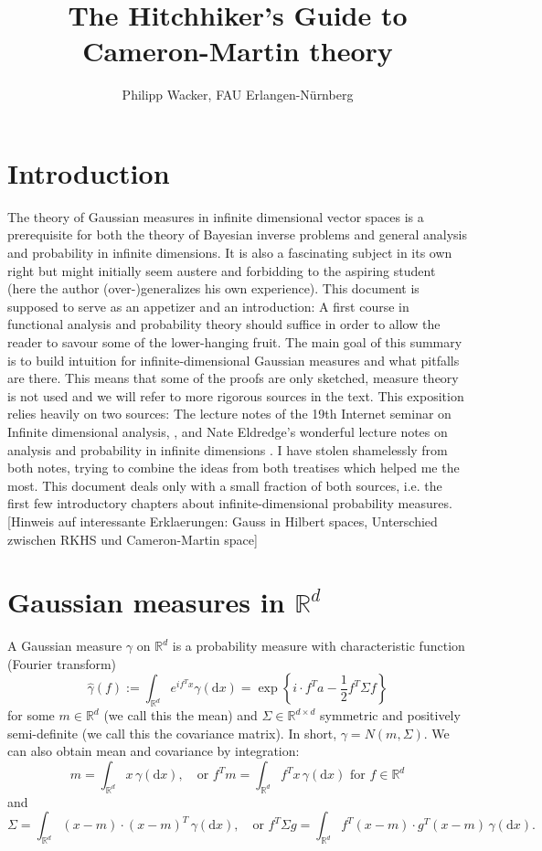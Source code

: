 \documentclass{scrartcl}
\title{The Hitchhiker's Guide to Cameron-Martin theory}
\author{Philipp Wacker, FAU Erlangen-N\"urnberg}
\theoremstyle{definition}
\theoremstyle{remark}
\newcommand{\de}{\mathrm d}
\newcommand{\R}{\mathbb R}
\newcommand{\ednote}[1]{{\color{red}[#1]}}
\begin{document}
\maketitle

\section{Introduction}
The theory of Gaussian measures in infinite dimensional vector spaces is a prerequisite for both the theory of Bayesian inverse problems and general analysis and probability in infinite dimensions. It is also a fascinating subject in its own right but might initially seem austere and forbidding to the aspiring student (here the author (over-)generalizes his own experience). This document is supposed to serve as an appetizer and an introduction: A first course in functional analysis and probability theory should suffice in order to allow the reader to savour some of the lower-hanging fruit. The main goal of this summary is to build intuition for infinite-dimensional Gaussian measures and what pitfalls are there. This means that some of the proofs are only sketched, measure theory is not used and we will refer to more rigorous sources in the text.  This exposition relies heavily on two sources: The lecture notes of the 19th Internet seminar on Infinite dimensional analysis, \cite{Lunardi}, and Nate Eldredge's wonderful lecture notes on analysis and probability in infinite dimensions \cite{eldredge2016analysis}. I have stolen shamelessly from both notes, trying to combine the ideas from both treatises which helped me the most. This document deals only with a small fraction of both sources, i.e. the first few introductory chapters about infinite-dimensional probability measures.
\ednote{Hinweis auf interessante Erklaerungen: Gauss in Hilbert spaces, Unterschied zwischen RKHS und Cameron-Martin space}
\section{Gaussian measures in $\R^d$}
A Gaussian measure $\gamma$ on $\R^d$ is a probability measure with characteristic function (Fourier transform)
\[ \hat \gamma(f) := \int_{\R^d} e^{if^Tx}\gamma(\de x) = \exp\left\{i\cdot f^Ta - \frac{1}{2}f^T\Sigma f\right\} \]
for some $m\in\R^d$ (we call this the mean) and $\Sigma \in\R^{d\times d}$ symmetric and positively semi-definite (we call this the covariance matrix). In short, $\gamma = N(m, \Sigma)$. 
We can also obtain mean and covariance by integration:
\[ m = \int_{\R^d} x \, \gamma(\de x),\quad \text{or } f^Tm = \int_{\R^d} f^T x \, \gamma(\de x) \text{ for } f\in\R^d \]
and 
\[ \Sigma = \int_{\R^d} (x-m)\cdot (x-m)^T \, \gamma(\de x), \quad \text{or } f^T\Sigma g = \int_{\R^d}f^T(x-m) \cdot g^T(x-m)\, \gamma(\de x). \]
\end{document}
